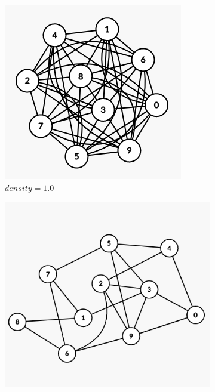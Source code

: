 \documentclass[letterpaper, 10 pt, conference]{ieeeconf}  %
\begin{document}
\begin{figure}[H]
	\centering
	\begin{subfigure}[b]{0.15\textwidth}
		\centering
		\includegraphics[width=\textwidth]{sparsegraph100}
		\caption{$density=1.0$}
	\end{subfigure}
	\begin{subfigure}[b]{0.15\textwidth}
		\centering
		\includegraphics[width=\textwidth]{sparsegraph25}

\end{subfigure}
\end{figure}
\end{document}
